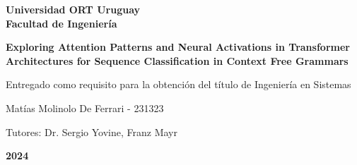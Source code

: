 \begin{center}

\textbf{\fontsize{14pt}{21pt}\selectfont Universidad ORT Uruguay\\Facultad de Ingeniería}

\bigskip\bigskip\bigskip\bigskip


\fontsize{24pt}{30pt}\selectfont 
\textbf{Exploring Attention Patterns and Neural Activations in Transformer Architectures for Sequence Classification in Context Free Grammars}


\bigskip\bigskip\bigskip\bigskip


\fontsize{14pt}{21pt}\selectfont Entregado como requisito para la obtención del título de Ingeniería en Sistemas


\bigskip
\bigskip
\bigskip\bigskip\bigskip


\fontsize{14pt}{21pt}\selectfont Matías Molinolo De Ferrari - 231323


\bigskip
\bigskip
\bigskip
\bigskip
\fontsize{14pt}{21pt}\selectfont Tutores: Dr. Sergio Yovine, Franz Mayr


\bigskip\bigskip\bigskip\bigskip


\fontsize{20pt}{21pt}\selectfont \textbf{2024}


\end{center}
\vspace*{\fill}
